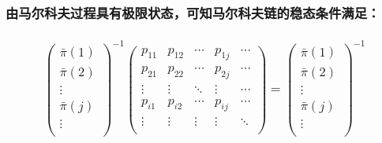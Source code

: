 \documentclass[11pt]{article}
\begin{document}
\subsubsection{由马尔科夫过程具有极限状态，可知马尔科夫链的稳态条件满足：}\label{ux7531ux9a6cux5c14ux79d1ux592bux8fc7ux7a0bux5177ux6709ux6781ux9650ux72b6ux6001ux53efux77e5ux9a6cux5c14ux79d1ux592bux94feux7684ux7a33ux6001ux6761ux4ef6ux6ee1ux8db3}

\subsubsection{\texorpdfstring{\[ 
         \left (\begin{matrix}
        \bar\pi(1)\\ \bar\pi(2) \\ \vdots \\ \bar\pi(j)\\ \vdots  \\
        \end{matrix} \right)^{-1}
        \left (\begin{matrix}
        p_{11} & p_{12} & \cdots &p_{1j}& \cdots  \\
        p_{21}  & p_{22} & \cdots &p_{2j}& \cdots \\
        \vdots & \vdots & \ddots & \vdots & \cdots \\
        p_{i1} & p_{i2} & \cdots & p_{ij} & \cdots \\
        \vdots & \vdots & \vdots & \vdots & \ddots \\
        \end{matrix} \right)=
         \left (\begin{matrix}
        \bar\pi(1)\\ \bar\pi(2) \\ \vdots \\ \bar\pi(j)\\ \vdots  \\
        \end{matrix} \right)^{-1}
        \]}{ 
         \textbackslash{}left (\textbackslash{}begin\{matrix\}
        \textbackslash{}bar\textbackslash{}pi(1)\textbackslash{}\textbackslash{} \textbackslash{}bar\textbackslash{}pi(2) \textbackslash{}\textbackslash{} \textbackslash{}vdots \textbackslash{}\textbackslash{} \textbackslash{}bar\textbackslash{}pi(j)\textbackslash{}\textbackslash{} \textbackslash{}vdots  \textbackslash{}\textbackslash{}
        \textbackslash{}end\{matrix\} \textbackslash{}right)\^{}\{-1\}
        \textbackslash{}left (\textbackslash{}begin\{matrix\}
}}
\end{document}
